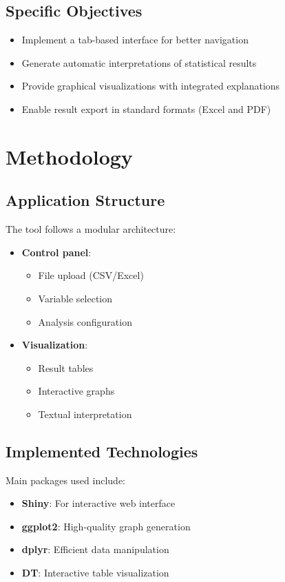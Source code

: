 \documentclass[12pt]{article}
\begin{document}
\subsection{Specific Objectives}
\begin{itemize}
    \item Implement a tab-based interface for better navigation
    \item Generate automatic interpretations of statistical results
    \item Provide graphical visualizations with integrated explanations
    \item Enable result export in standard formats (Excel and PDF)
\end{itemize}

\section{Methodology}
\subsection{Application Structure}
The tool follows a modular architecture:

\begin{itemize}
    \item \textbf{Control panel}:
    \begin{itemize}
        \item File upload (CSV/Excel)
        \item Variable selection
        \item Analysis configuration
    \end{itemize}
    \item \textbf{Visualization}:
    \begin{itemize}
        \item Result tables
        \item Interactive graphs
        \item Textual interpretation
    \end{itemize}
\end{itemize}

\subsection{Implemented Technologies}
Main packages used include:

\begin{itemize}
    \item \textbf{Shiny}: For interactive web interface
    \item \textbf{ggplot2}: High-quality graph generation
    \item \textbf{dplyr}: Efficient data manipulation
    \item \textbf{DT}: Interactive table visualization
\end{itemize}
\end{document}
